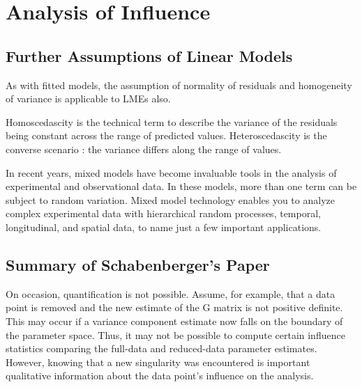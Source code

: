 \documentclass[12pt, a4paper]{article}
\begin{document}
\section{Analysis of  Influence}



\subsection{Further Assumptions of Linear Models}

As with fitted models, the assumption of normality of residuals and homogeneity of variance is applicable to LMEs also. 



Homoscedascity is the technical term to describe the variance of the residuals being constant across the range of predicted values.
Heteroscedascity is the converse scenario : the variance differs along the range of values.


% 
% 



In recent years, mixed models have become invaluable tools in the analysis of experimental and observational
data. In these models, more than one term can be subject to random variation. Mixed model technology enables you to analyze complex experimental data with hierarchical random processes, temporal,
longitudinal, and spatial data, to name just a few important applications. 


\subsection{Summary of Schabenberger's Paper}

On occasion, quantification is not possible. Assume, for example, that a data point is removed
and the new estimate of the G matrix is not positive definite. This may occur if a variance component
estimate now falls on the boundary of the parameter space. Thus, it may not be possible to compute certain
influence statistics comparing the full-data and reduced-data parameter estimates. However, knowing that
a new singularity was encountered is important qualitative information about the data point’s influence on
the analysis.
\end{document}
